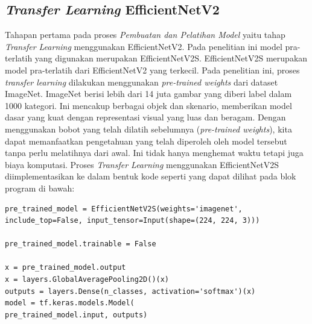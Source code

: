 \subsection{\textit{Transfer Learning} EfficientNetV2}
Tahapan pertama pada proses \textit{Pembuatan dan Pelatihan Model} yaitu tahap \textit{Transfer Learning} menggunakan EfficientNetV2. Pada penelitian ini model pra-terlatih yang digunakan merupakan EfficientNetV2S. EfficientNetV2S merupakan model pra-terlatih dari EfficientNetV2 yang terkecil. Pada penelitian ini, proses \textit{transfer learning} dilakukan menggunakan \textit{pre-trained weights} dari dataset ImageNet. ImageNet berisi lebih dari 14 juta gambar yang diberi label dalam 1000 kategori. Ini mencakup berbagai objek dan skenario, memberikan model dasar yang kuat dengan representasi visual yang luas dan beragam. Dengan menggunakan bobot yang telah dilatih sebelumnya (\textit{pre-trained weights}), kita dapat memanfaatkan pengetahuan yang telah diperoleh oleh model tersebut tanpa perlu melatihnya dari awal. Ini tidak hanya menghemat waktu tetapi juga biaya komputasi. Proses \textit{Transfer Learning} menggunakan EfficientNetV2S diimplementasikan ke dalam bentuk kode seperti yang dapat dilihat pada blok program di bawah:

\begin{lstlisting}[style=customc]
pre_trained_model = EfficientNetV2S(weights='imagenet', 
include_top=False, input_tensor=Input(shape=(224, 224, 3)))

pre_trained_model.trainable = False

x = pre_trained_model.output
x = layers.GlobalAveragePooling2D()(x)
outputs = layers.Dense(n_classes, activation='softmax')(x)
model = tf.keras.models.Model(
pre_trained_model.input, outputs)
\end{lstlisting}

